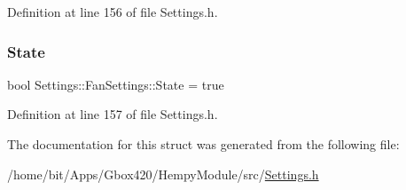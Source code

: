 Definition at line 156 of file Settings.\+h.

\mbox{\label{struct_settings_1_1_fan_settings_a3ea9cf9677be0fa6ab67bf78aa4971f1}} 
\subsubsection{\texorpdfstring{State}{State}}
{\footnotesize\ttfamily bool Settings\+::\+Fan\+Settings\+::\+State = true}



Definition at line 157 of file Settings.\+h.



The documentation for this struct was generated from the following file\+:\begin{DoxyCompactItemize}
\item 
/home/bit/\+Apps/\+Gbox420/\+Hempy\+Module/src/\hyperlink{_hempy_module_2src_2_settings_8h}{Settings.\+h}\end{DoxyCompactItemize}
